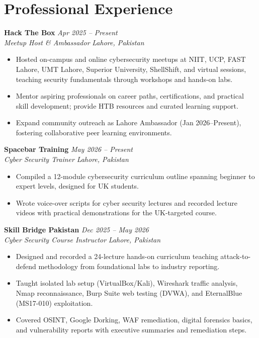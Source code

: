 \documentclass[11pt,a4paper]{article}
\newcommand{\resumeSubheading}[4]{%
  \textbf{#1} \hfill \textit{#2} \\
  \textit{#3} \hfill \textit{#4} \\
}
\newcommand{\resumeItemList}{\begin{itemize}[leftmargin=*, nosep, topsep=2pt]}
\newcommand{\resumeItemListEnd}{\end{itemize}}
\begin{document}
\section{Professional Experience}

\resumeSubheading{Hack The Box}{Apr 2025 -- Present}{Meetup Host \& Ambassador}{Lahore, Pakistan}
\resumeItemList
  \item Hosted on-campus and online cybersecurity meetups at NIIT, UCP, FAST Lahore, UMT Lahore, Superior University, ShellShift, and virtual sessions, teaching security fundamentals through workshops and hands-on labs.
  \item Mentor aspiring professionals on career paths, certifications, and practical skill development; provide HTB resources and curated learning support.
  \item Expand community outreach as Lahore Ambassador (Jan 2026--Present), fostering collaborative peer learning environments.
\resumeItemListEnd

\vspace{4pt}

\resumeSubheading{Spacebar Training}{May 2026 -- Present}{Cyber Security Trainer}{Lahore, Pakistan}
\resumeItemList
  \item Compiled a 12-module cybersecurity curriculum outline spanning beginner to expert levels, designed for UK students.
  \item Wrote voice-over scripts for cyber security lectures and recorded lecture videos with practical demonstrations for the UK-targeted course.
\resumeItemListEnd

\vspace{4pt}

\resumeSubheading{Skill Bridge Pakistan}{Dec 2025 -- May 2026}{Cyber Security Course Instructor}{Lahore, Pakistan}
\resumeItemList
  \item Designed and recorded a 24-lecture hands-on curriculum teaching attack-to-defend methodology from foundational labs to industry reporting.
  \item Taught isolated lab setup (VirtualBox/Kali), Wireshark traffic analysis, Nmap reconnaissance, Burp Suite web testing (DVWA), and EternalBlue (MS17-010) exploitation.
  \item Covered OSINT, Google Dorking, WAF remediation, digital forensics basics, and vulnerability reports with executive summaries and remediation steps.
\resumeItemListEnd

\vspace{4pt}
\end{document}
